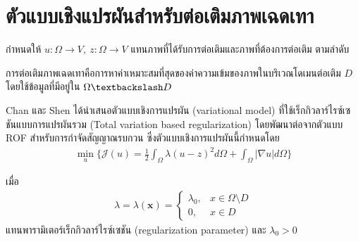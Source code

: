 \section{ตัวแบบเชิงแปรผันสำหรับต่อเติมภาพเฉดเทา}\label{inpaint-model-grayscale}

\hspace{1cm} กำหนดให้ $ u: \Omega \rightarrow V,\ z: \Omega \rightarrow V$ แทนภาพที่ได้รับการต่อเติมและภาพที่ต้องการต่อเติม ตามลำดับ



\hspace{1cm} การต่อเติมภาพเฉดเทาคือการหาค่าเหมาะสมที่สุดของค่าความเข้มของภาพในบริเวณโดเมนต่อเติม $D$ โดยใช้ข้อมูลที่มีอยู่ใน $\Omega \textbackslash D$ 

\hspace{1cm} Chan และ Shen \cite{ref:rof-inpaint-chan-shen} ได้นำเสนอตัวแบบเชิงการแปรผัน (variational model) ที่ใช้เร็กกิวลาร์ไรซ์เซชันแบบการแปรผันรวม (Total variation based regularization) โดยพัฒนาต่อจากตัวแบบ ROF สำหรับการกำจัดสัญญาณรบกวน \cite{ref:ROF-template} ซึ่งตัวแบบเชิงการแปรผันนี้กำหนดโดย
\begin{align}
    \min_{u} \{ \mathcal{J}(u) = \frac{1}{2} \int_{\Omega}\lambda (u-z)^2 d\Omega +  \int_{\Omega}  |\nabla u|  d\Omega \}
\label{e1}
\end{align}

เมื่อ 
\begin{align}
    \lambda=\lambda(\mathbf{x}) = \left \{ \begin{array}{ll}  \lambda_0, & x \in \Omega \setminus D \\ 0, & x \in D  \end{array} \right . 
    \label{e2}
\end{align}
แทนพารามิเตอร์เร็กกิวลาร์ไรซ์เซชัน (regularization parameter) และ $\lambda_0 >0$
